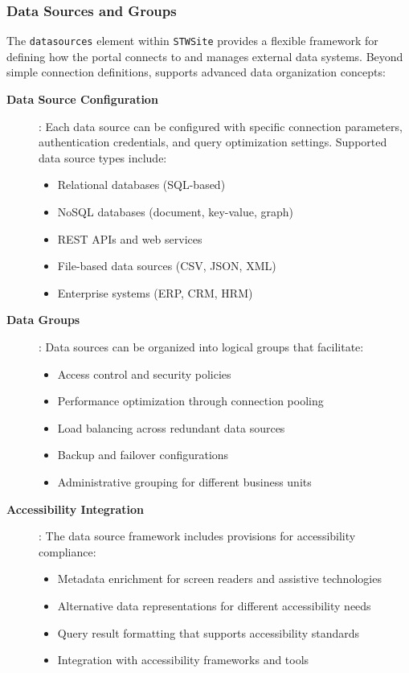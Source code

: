 \subsubsection{Data Sources and Groups}
\label{sec:datasources-groups}

The \texttt{datasources} element within \texttt{STWSite} provides a flexible framework for defining how the portal connects to and manages external data systems. Beyond simple connection definitions, \wbdl{} supports advanced data organization concepts:

\begin{description}
\item[\textbf{Data Source Configuration}]: Each data source can be configured with specific connection parameters, authentication credentials, and query optimization settings. Supported data source types include:
\begin{itemize}
\item Relational databases (SQL-based)
\item NoSQL databases (document, key-value, graph)
\item REST APIs and web services
\item File-based data sources (CSV, JSON, XML)
\item Enterprise systems (ERP, CRM, HRM)
\end{itemize}

\item[\textbf{Data Groups}]: Data sources can be organized into logical groups that facilitate:
\begin{itemize}
\item Access control and security policies
\item Performance optimization through connection pooling
\item Load balancing across redundant data sources
\item Backup and failover configurations
\item Administrative grouping for different business units
\end{itemize}

\item[\textbf{Accessibility Integration}]: The data source framework includes provisions for accessibility compliance:
\begin{itemize}
\item Metadata enrichment for screen readers and assistive technologies
\item Alternative data representations for different accessibility needs
\item Query result formatting that supports accessibility standards
\item Integration with accessibility frameworks and tools
\end{itemize}
\end{description}

